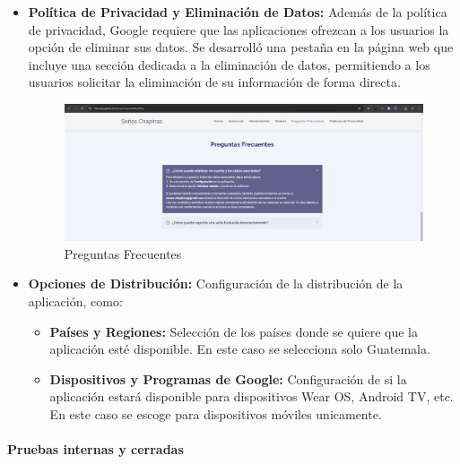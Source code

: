 \begin{itemize}
    \item \textbf{Política de Privacidad y Eliminación de Datos:} Además de la política de privacidad, Google requiere que las aplicaciones ofrezcan a los usuarios la opción de eliminar sus datos. Se desarrolló una pestaña en la página web que incluye una sección dedicada a la eliminación de datos, permitiendo a los usuarios solicitar la eliminación de su información de forma directa.

    \begin{figure} [H]
        \centering
        \includegraphics[width=1\linewidth]{figuras/pagina_web_preguntas.png}
        \caption{Preguntas Frecuentes}
        \label{fig:enter-label}
    \end{figure}
        
        
    \item \textbf{Opciones de Distribución:} Configuración de la distribución de la aplicación, como:
    \begin{itemize}
        \item \textbf{Países y Regiones:} Selección de los países donde se quiere que la aplicación esté disponible. En este caso se selecciona solo Guatemala. 
        \item \textbf{Dispositivos y Programas de Google:} Configuración de si la aplicación estará disponible para dispositivos Wear OS, Android TV, etc. En este caso se escoge para dispositivos móviles unicamente. 
    \end{itemize}
\end{itemize}

\paragraph{Pruebas internas y cerradas}

